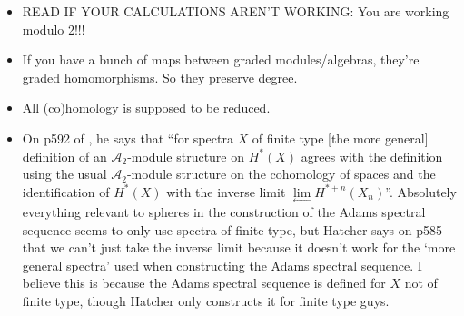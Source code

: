 \documentclass{MetricNotes2023}
\def\A{\ensuremath{\mathscr{A}_2}}
\begin{document}
\begin{itemize}
\item READ IF YOUR CALCULATIONS AREN'T WORKING: You are working modulo 2!!!
\item If you have a bunch of maps between graded modules/algebras, they're graded homomorphisms. So they preserve degree. 
\item All (co)homology is supposed to be reduced.
\item On p592 of \autocite{hatcher5}, he says that ``for spectra \(X\) of finite type [the more general] definition of an \(\A\)-module structure on \(H^*(X)\) agrees with the definition using the usual \(\A\)-module structure on the cohomology of spaces and the identification of \(H^*(X)\) with the inverse limit \(\lim\limits_{\leftarrow}H^{*+n}(X_n)\)''. Absolutely everything relevant to spheres in the construction of the Adams spectral sequence seems to only use spectra of finite type, but Hatcher says on p585 that we can't just take the inverse limit because it doesn't work for the `more general spectra' used when constructing the Adams spectral sequence. I believe this is because the Adams spectral sequence is defined for \(X\) not of finite type, though Hatcher only constructs it for finite type guys.
\end{itemize}

\printbibliography
\end{document}

